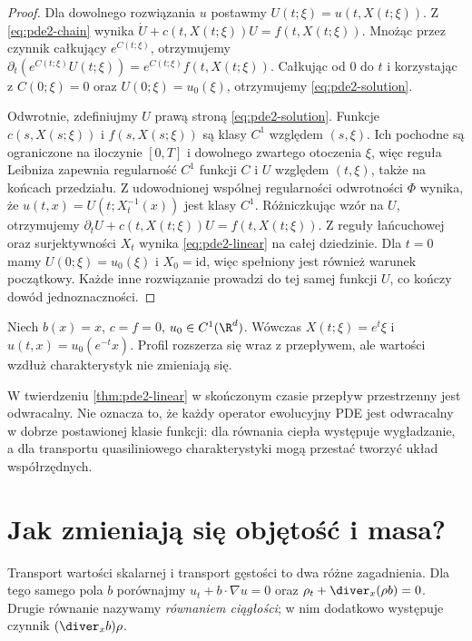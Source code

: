 \begin{proof}
Dla dowolnego rozwiązania $u$ postawmy
$U(t;\xi)=u(t,X(t;\xi))$. Z \eqref{eq:pde2-chain}
wynika $\dot U+c(t,X(t;\xi))U=f(t,X(t;\xi))$.
Mnożąc przez czynnik całkujący $e^{C(t;\xi)}$,
otrzymujemy
$\partial_t(e^{C(t;\xi)}U(t;\xi))
=e^{C(t;\xi)}f(t,X(t;\xi))$.
Całkując od $0$ do $t$ i korzystając z $C(0;\xi)=0$
oraz $U(0;\xi)=u_0(\xi)$, otrzymujemy \eqref{eq:pde2-solution}.

Odwrotnie, zdefiniujmy $U$ prawą stroną
\eqref{eq:pde2-solution}. Funkcje $c(s,X(s;\xi))$
i $f(s,X(s;\xi))$ są klasy $C^1$ względem $(s,\xi)$.
Ich pochodne są ograniczone na iloczynie $[0,T]$
i dowolnego zwartego otoczenia $\xi$, więc reguła Leibniza
zapewnia regularność $C^1$ funkcji $C$ i $U$ względem
$(t,\xi)$, także na końcach przedziału.
Z udowodnionej wspólnej regularności odwrotności $\Phi$
wynika, że $u(t,x)=U(t;X_t^{-1}(x))$ jest klasy $C^1$.
Różniczkując wzór na $U$, otrzymujemy
$\partial_t U+c(t,X(t;\xi))U=f(t,X(t;\xi))$.
Z reguły łańcuchowej oraz surjektywności $X_t$ wynika
\eqref{eq:pde2-linear} na całej dziedzinie.
Dla $t=0$ mamy $U(0;\xi)=u_0(\xi)$ i $X_0=\mathrm{id}$,
więc spełniony jest również warunek początkowy.
Każde inne rozwiązanie prowadzi do tej samej funkcji $U$,
co kończy dowód jednoznaczności.
\end{proof}

\begin{przyklad}
Niech $b(x)=x$, $c=f=0$, $u_0\in C^1(\R^d)$.
Wówczas $X(t;\xi)=e^t\xi$ i
$u(t,x)=u_0(e^{-t}x)$. Profil rozszerza się
wraz z przepływem, ale wartości wzdłuż charakterystyk
nie zmieniają się.
\end{przyklad}

\begin{uwaga}
W twierdzeniu \ref{thm:pde2-linear} w skończonym czasie
przepływ przestrzenny jest odwracalny. Nie oznacza to,
że każdy operator ewolucyjny PDE jest odwracalny
w dobrze postawionej klasie funkcji: dla równania ciepła
występuje wygładzanie, a dla transportu quasiliniowego
charakterystyki mogą przestać tworzyć układ współrzędnych.
\end{uwaga}

\section{Jak zmieniają się objętość i masa?}
\label{sec:pde2-jacobian}

Transport wartości skalarnej i transport gęstości to
dwa różne zagadnienia. Dla tego samego pola $b$ porównajmy
$u_t+b\cdot\nabla u=0$ oraz
$\rho_t+\diver_x(\rho b)=0$. Drugie równanie nazywamy
\emph{równaniem ciągłości}; w nim dodatkowo występuje
czynnik $(\diver_x b)\rho$.

